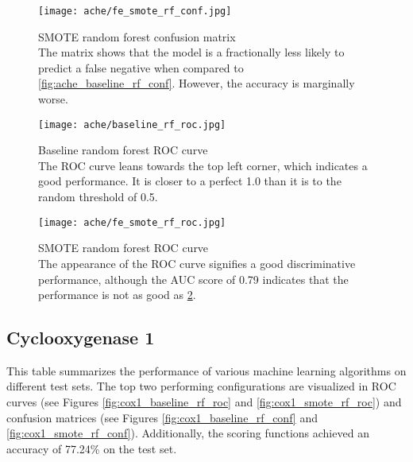 \begin{figure}[H]
    \begin{center}
        \captionsetup{justification=centering}
        \texttt{[image: ache/fe\_smote\_rf\_conf.jpg]}
        \caption[]{SMOTE random forest confusion matrix\\The matrix shows that the model is a fractionally less likely to predict a false negative when compared to \ref*{fig:ache_baseline_rf_conf}. However, the accuracy is marginally worse.}
        \label{fig:ache_smote_rf_conf}
    \end{center}
\end{figure}

\begin{figure}[H]
    \begin{center}
        \captionsetup{justification=centering}
        \texttt{[image: ache/baseline\_rf\_roc.jpg]}
        \caption[]{Baseline random forest ROC curve\\The ROC curve leans towards the top left corner, which indicates a good performance. It is closer to a perfect 1.0 than it is to the random threshold of 0.5.}
        \label{fig:ache_baseline_rf_roc}
    \end{center}
\end{figure}

\begin{figure}[H]
    \begin{center}
        \captionsetup{justification=centering}
        \texttt{[image: ache/fe\_smote\_rf\_roc.jpg]}
        \caption[]{SMOTE random forest ROC curve\\The appearance of the ROC curve signifies a good discriminative performance, although the AUC score of 0.79 indicates that the performance is not as good as \ref*{fig:ache_baseline_rf_roc}.        }
        \label{fig:ache_smote_rf_roc}
    \end{center}
\end{figure}

\subsection{Cyclooxygenase 1}
This table summarizes the performance of various machine learning algorithms on different test sets.
The top two performing configurations are visualized in ROC curves (see Figures \ref{fig:cox1_baseline_rf_roc} and \ref{fig:cox1_smote_rf_roc})
and confusion matrices (see Figures \ref{fig:cox1_baseline_rf_conf} and \ref{fig:cox1_smote_rf_conf}). Additionally,
the scoring functions achieved an accuracy of 77.24\% on the test set.

